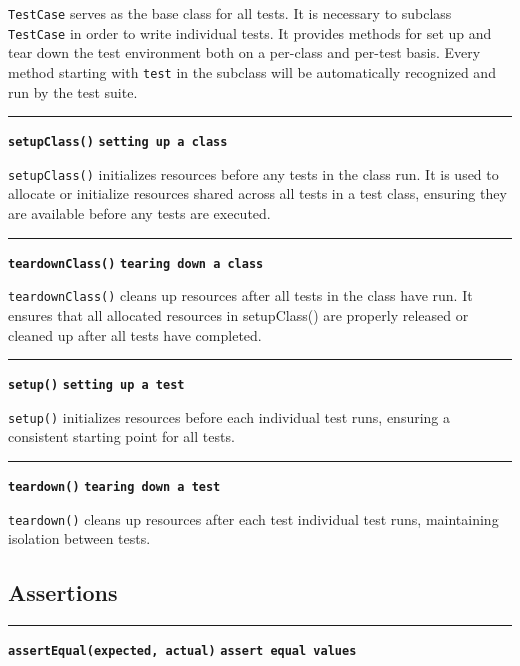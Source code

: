 \documentclass[letterpaper,12pt]{article}
\begin{document}
\texttt{TestCase} serves as the base class for all tests. It is necessary to subclass \texttt{TestCase} in order to write individual tests. It provides methods for set up and tear down the test environment both on a per-class and per-test basis. Every method starting with \texttt{test} in the subclass will be automatically recognized and run by the test suite.


\bigskip
\hrule\vspace{0.1cm}
\noindent
{\tt\bf setupClass()} \hfill {\tt\bf setting up a class}

\vspace{0.1cm}
\noindent
\texttt{setupClass()} initializes resources before any tests in the class run. It is used to allocate or initialize resources shared across all tests in a test class, ensuring they are available before any tests are executed.

\newpage
\bigskip
\hrule\vspace{0.1cm}
\noindent
{\tt\bf teardownClass()} \hfill {\tt\bf tearing down a class}

\vspace{0.1cm}
\noindent
\texttt{teardownClass()} cleans up resources after all tests in the class have run. It ensures that all allocated resources in setupClass() are properly released or cleaned up after all tests have completed.

\bigskip
\hrule\vspace{0.1cm}
\noindent
{\tt\bf setup()} \hfill {\tt\bf setting up a test}

\vspace{0.1cm}
\noindent
\texttt{setup()} initializes resources before each individual test runs, ensuring a consistent starting point for all tests.

\bigskip
\hrule\vspace{0.1cm}
\noindent
{\tt\bf teardown()} \hfill {\tt\bf tearing down a test}

\vspace{0.1cm}
\noindent
\texttt{teardown()} cleans up resources after each test individual test runs, maintaining isolation between tests.

\subsection{Assertions}

\bigskip
\hrule\vspace{0.1cm}
\noindent
{\tt\bf assertEqual(expected, actual)} \hfill {\tt\bf assert equal values}
\end{document}
